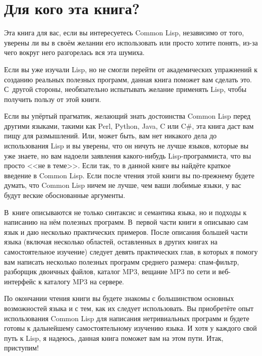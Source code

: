 \section{Для кого эта книга?}

Эта книга для вас, если вы интересуетесь Common Lisp, независимо от
того, уверены ли вы в своём желании его использовать или просто хотите понять,
из-за чего вокруг него разгорелась вся эта шумиха.

Если вы уже изучали Lisp, но не смогли перейти от академических упражнений к созданию
реальных полезных программ, данная книга поможет вам сделать это. С~другой
стороны, необязательно испытывать желание применять Lisp, чтобы получить пользу от этой
книги.

Если вы упёртый прагматик, желающий знать достоинства Common Lisp перед другими языками,
такими как Perl, Python, Java, C или C\#, эта книга даст вам пищу для размышлений.
Или, может быть, вам нет никакого дела до использования Lisp и вы уверены, что он
ничуть не лучше языков, которые вы уже знаете, но вам надоели заявления какого-нибудь
Lisp-программиста, что вы просто <<не в теме>>. Если так, то в данной книге вы
найдёте краткое введение в Common Lisp. Если после чтения этой книги вы по-прежнему будете
думать, что Common Lisp ничем не лучше, чем ваши любимые языки, у вас будут веские
обоснованные аргументы.

В~книге описываются не только синтаксис и семантика языка, но и подходы к напи\-са\-нию на
нём полезных программ. В~первой части книги я описываю сам язык и даю несколько
практических примеров. После описания большей части языка (включая несколько областей,
оставленных в других книгах на самостоятельное изучение) следует девять практических глав,
в которых я помогу вам написать несколько полезных программ среднего размера: спам-фильтр,
разборщик двоичных файлов, каталог MP3, вещание MP3 по сети и веб-интерфейс к каталогу MP3 на
сервере.

По окончании чтения книги вы будете знакомы с большинством основных возможностей языка
и с тем, как их следует использовать. Вы приобретёте опыт использования Common Lisp для
написания нетривиальных программ и будете готовы к дальнейшему самостоятельному изучению
языка. И хотя у каждого свой путь к Lisp, я надеюсь, данная книга поможет вам на этом
пути. Итак, приступим!

